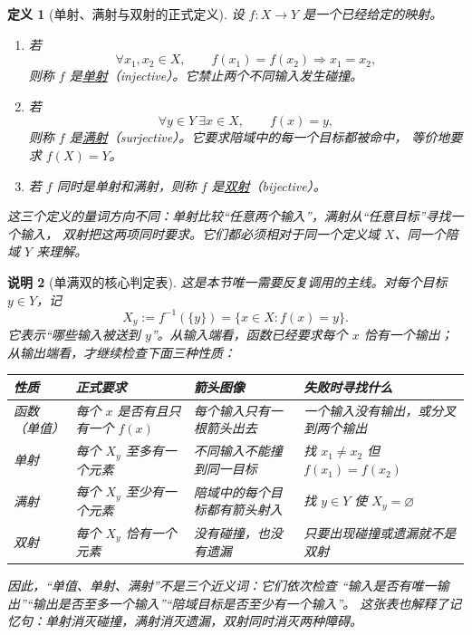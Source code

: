 \documentclass[UTF8,fontset=none,a4paper,11pt]{ctexart}
\theoremstyle{foundation-definition}
\newtheorem{definition}{定义}[section]
\theoremstyle{foundation-theorem}
\theoremstyle{foundation-proposition}
\theoremstyle{foundation-example}
\theoremstyle{foundation-remark}
\newtheorem{remark}[definition]{说明}
\theoremstyle{foundation-theorem}
\newcommand{\term}[2]{\hyperref[#1]{#2}}
\begin{document}
\begin{definition}[单射、满射与双射的正式定义]
设 \(f:X\to Y\) 是一个已经给定的映射。

\begin{enumerate}[label=(\arabic*)]
  \item \label{def:injective}若
  \[
    \forall x_1,x_2\in X,\qquad
    f(x_1)=f(x_2)\Longrightarrow x_1=x_2,
  \]
  则称 \(f\) 是\term{def:injective}{单射}（injective）。它禁止两个不同输入发生碰撞。

  \item \label{def:surjective}若
  \[
    \forall y\in Y\ \exists x\in X,\qquad f(x)=y,
  \]
  则称 \(f\) 是\term{def:surjective}{满射}（surjective）。它要求陪域中的每一个目标都被命中，
  等价地要求 \(f(X)=Y\)。

  \item \label{def:bijective}若 \(f\) 同时是单射和满射，则称 \(f\) 是\term{def:bijective}{双射}（bijective）。
\end{enumerate}

这三个定义的量词方向不同：单射比较“任意两个输入”，满射从“任意目标”寻找一个输入，
双射把这两项同时要求。它们都必须相对于同一个定义域 \(X\)、同一个陪域 \(Y\) 来理解。
\end{definition}

\begin{remark}[单满双的核心判定表]\label{rem:map-core-table}
这是本节唯一需要反复调用的主线。对每个目标 \(y\in Y\)，记
\[
  X_y:=f^{-1}(\{y\})=\{x\in X:f(x)=y\}.
\]
它表示“哪些输入被送到 \(y\)”。从输入端看，函数已经要求每个 \(x\) 恰有一个输出；从输出端看，才继续检查下面三种性质：
\begin{center}
\small
\begin{tabularx}{\textwidth}{p{}p{}p{}X}
\toprule
性质 & 正式要求 & 箭头图像 & 失败时寻找什么 \\
\midrule
函数（单值）
& 每个 \(x\) 是否有且只有一个 \(f(x)\)
& 每个输入只有一根箭头出去
& 一个输入没有输出，或分叉到两个输出 \\
单射
& 每个 \(X_y\) 至多有一个元素
& 不同输入不能撞到同一目标
& 找 \(x_1\ne x_2\) 但 \(f(x_1)=f(x_2)\) \\
满射
& 每个 \(X_y\) 至少有一个元素
& 陪域中的每个目标都有箭头射入
& 找 \(y\in Y\) 使 \(X_y=\varnothing\) \\
双射
& 每个 \(X_y\) 恰有一个元素
& 没有碰撞，也没有遗漏
& 只要出现碰撞或遗漏就不是双射 \\
\bottomrule
\end{tabularx}
\end{center}
因此，“单值、单射、满射”不是三个近义词：它们依次检查
“输入是否有唯一输出”“输出是否至多一个输入”“陪域目标是否至少有一个输入”。
这张表也解释了记忆句：单射消灭碰撞，满射消灭遗漏，双射同时消灭两种障碍。
\end{remark}
\end{document}
